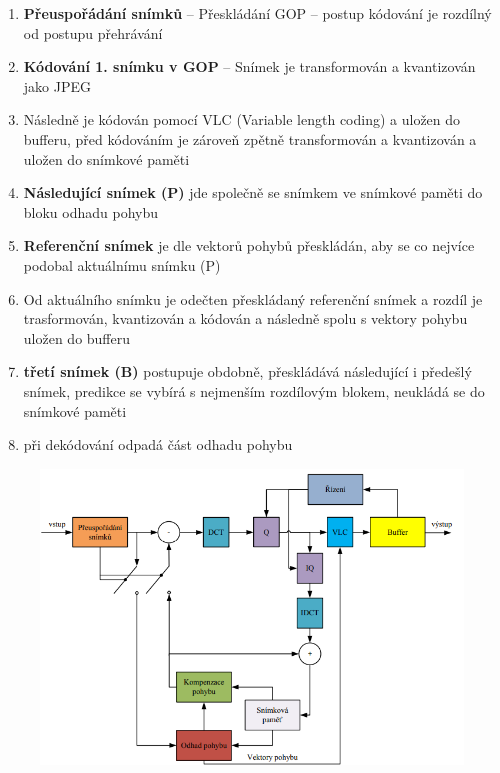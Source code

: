 \begin{enumerate}
    \item \textbf{Přeuspořádání snímků} -- Přeskládání GOP – postup kódování je rozdílný od postupu přehrávání
    \item \textbf{Kódování 1. snímku v GOP} -- Snímek je transformován a kvantizován jako JPEG
\item Následně je kódován pomocí VLC (Variable length coding) a uložen do bufferu, před kódováním je zároveň zpětně
transformován a kvantizován a uložen do snímkové paměti
\item \textbf{Následující snímek (P)} jde společně se snímkem ve snímkové paměti do bloku odhadu pohybu
\item \textbf{Referenční snímek} je dle vektorů pohybů přeskládán, aby se co nejvíce podobal aktuálnímu snímku (P)
\item Od aktuálního snímku je odečten přeskládaný referenční snímek a rozdíl je trasformován, kvantizován a kódován a
následně spolu s vektory pohybu uložen do bufferu
\item \textbf{třetí snímek (B)} postupuje obdobně, přeskládává následující i předešlý snímek, predikce se vybírá s nejmenším rozdílovým blokem, neukládá se do snímkové paměti
\item při dekódování odpadá část odhadu pohybu
\end{enumerate}

\begin{figure}[ht]
    \centering
    \includegraphics[width=0.7\linewidth]{images/mpeg-koder.png}
\end{figure}
\FloatBarrier

